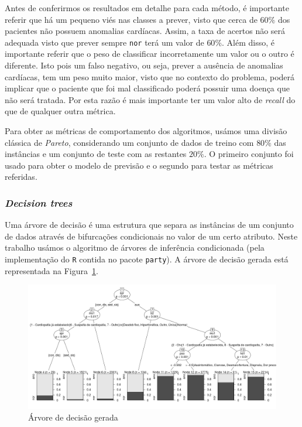 \documentclass[10pt, conference, compsocconf]{IEEEtran}
\begin{document}
Antes de conferirmos os resultados em detalhe para cada método, é
importante referir que há um pequeno viés nas classes a prever, visto
que cerca de $60\%$ dos pacientes não possuem anomalias
cardíacas. Assim, a taxa de acertos não será adequada visto que prever
sempre {\tt nor} terá um valor de $60\%$. Além disso, é importante
referir que o peso de classificar incorretamente um valor ou o outro é
diferente. Isto pois um falso negativo, ou seja, prever a ausência de
anomalias cardíacas, tem um peso muito maior, visto que no contexto do
problema, poderá implicar que o paciente que foi mal classificado
poderá possuir uma doença que não será tratada. Por esta razão é mais
importante ter um valor alto de \textit{recall} do que de qualquer
outra métrica.

Para obter as métricas de comportamento dos algoritmos, usámos uma
divisão clássica de \textit{Pareto}, considerando um conjunto de dados
de treino com $80\%$ das instâncias e um conjunto de teste com as
restantes $20\%$. O primeiro conjunto foi usado para obter o modelo de
previsão e o segundo para testar as métricas referidas.


\subsubsection{\textit{Decision trees}}
Uma árvore de decisão é uma estrutura que separa as instâncias de um
conjunto de dados através de bifurcações condicionais no valor de um
certo atributo. Neste trabalho usámos o algoritmo de árvores de
inferência condicionada (pela implementação do {\tt R} contida no
pacote {\tt party}). A árvore de decisão gerada está representada na
Figura~\ref{fig:aprct}.

\begin{figure}[!ht]
  \centering
  \includegraphics[scale=0.5]{img/apr_ctree.png}
  \caption{Árvore de decisão gerada}
  \label{fig:aprct}
\end{figure}
\end{document}
